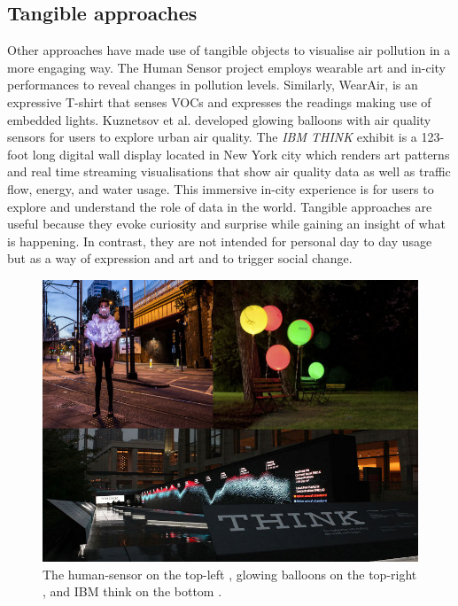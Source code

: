 \subsection{Tangible approaches}
Other approaches have made use of tangible objects to visualise air pollution in a more engaging way. The Human Sensor project \cite{InvisibleDust2016} employs wearable art and in-city performances to reveal changes in pollution levels. Similarly, WearAir, \cite{Kim2010} is an expressive T-shirt that senses VOCs and expresses the readings making use of embedded lights. Kuznetsov et al. \cite{Kuznetsov2011} developed glowing balloons with air quality sensors for users to explore urban air quality. The \textit{IBM THINK} exhibit \cite{IBM2012} is a 123-foot long digital wall display located in New York city which renders art patterns and real time streaming visualisations  that show air quality data as well as traffic flow, energy, and water usage. This immersive in-city experience is for users to explore and understand the role of data in the world. Tangible approaches are useful because they evoke curiosity and surprise while gaining an insight of what is happening. In contrast, they are not intended for personal day to day usage but as a way of expression and art and to trigger social change. 

\begin{figure}[H]
\begin{adjustbox}{width=.8\textwidth,center=\textwidth}
  \centering
  \includegraphics[scale=.4]{images/think_human_sensor_balloons.jpg}
\end{adjustbox}
  \caption[Tangible visualizations]{The human-sensor on the top-left \cite{InvisibleDust2016}, glowing balloons on the top-right \cite{Kuznetsov2011}, and IBM think on the bottom \cite{IBM2012}.}
  \label{fig:photo_based_instaNO2}
\end{figure}

